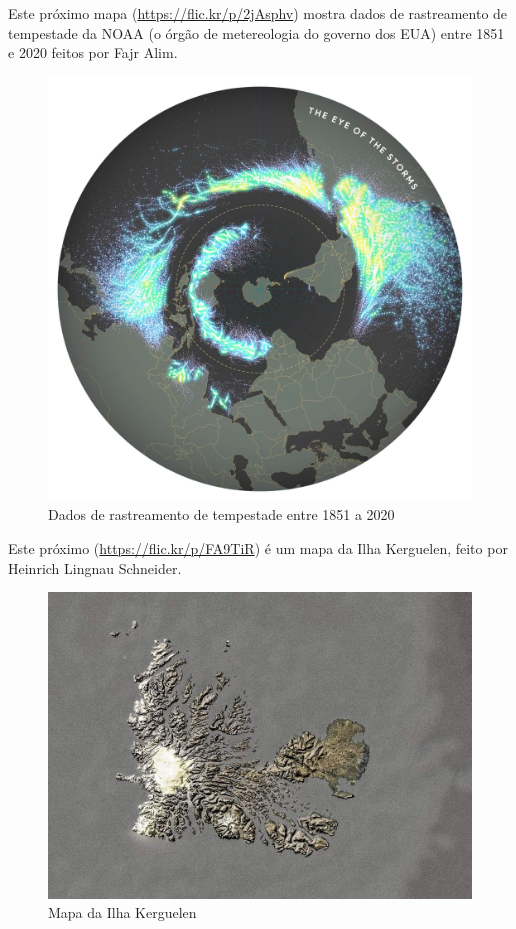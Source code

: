\documentclass[
]{krantz}
\begin{document}
Este próximo mapa (\url{https://flic.kr/p/2jAsphv}) mostra dados de rastreamento de tempestade da NOAA (o órgão de metereologia do governo dos EUA) entre 1851 e 2020 feitos por Fajr Alim.

\begin{figure}
\centering
\includegraphics{media/modulo1/sample-2.jpg}
\caption{Dados de rastreamento de tempestade entre 1851 a 2020}
\end{figure}

Este próximo (\url{https://flic.kr/p/FA9TiR}) é um mapa da Ilha Kerguelen, feito por Heinrich Lingnau Schneider.

\begin{figure}
\centering
\includegraphics{media/modulo1/sample-3.jpg}
\caption{Mapa da Ilha Kerguelen}
\end{figure}
\end{document}
